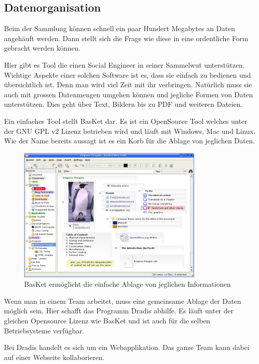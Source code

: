 \subsection{Datenorganisation}
Beim der Sammlung können schnell ein paar Hundert Megabytes an Daten angehäuft werden. Dann stellt sich die Frage wie diese in eine ordentliche Form gebracht werden können. 

Hier gibt es Tool die einen Social Engineer in seiner Sammelwut unterstützen. Wichtige Aspekte einer solchen Software ist es, dass sie einfach zu bedienen und übersichtlich ist. Denn man wird viel Zeit mit ihr verbringen. Natürlich muss sie auch mit grossen Datenmengen umgehen können und jegliche Formen von Daten unterstützen. Dies geht über Text, Bildern bis zu PDF und weiteren Dateien. 

Ein einfaches Tool stellt BasKet dar. Es ist ein OpenSource Tool welches unter der GNU GPL v2 Lizenz betrieben wird und läuft mit Windows, Mac und Linux. Wie der Name bereits aussagt ist es ein Korb für die Ablage von jeglichen Daten.

\begin{figure}[htb]
  \centering
  \includegraphics[width=0.8\textwidth]{images/basket.png}
  \caption[BasKet ermöglicht die einfache Ablage von jeglichen Informationen]{BasKet ermöglicht die einfache Ablage von jeglichen Informationen}
  \label{fig:socialengineering:informationssammlung:datenorganisation:basket}
\end{figure}

Wenn man in einem Team arbeitet, muss eine gemeinsame Ablage der Daten möglich sein. Hier schafft das Programm Dradis abhilfe. Es läuft unter der gleichen Opensource Lizenz wie BasKet und ist auch für die selben Betriebsysteme verfügbar. 

Bei Dradis handelt es sich um ein Webapplikation. Das ganze Team kann dabei auf einer Webseite kollaborieren.

